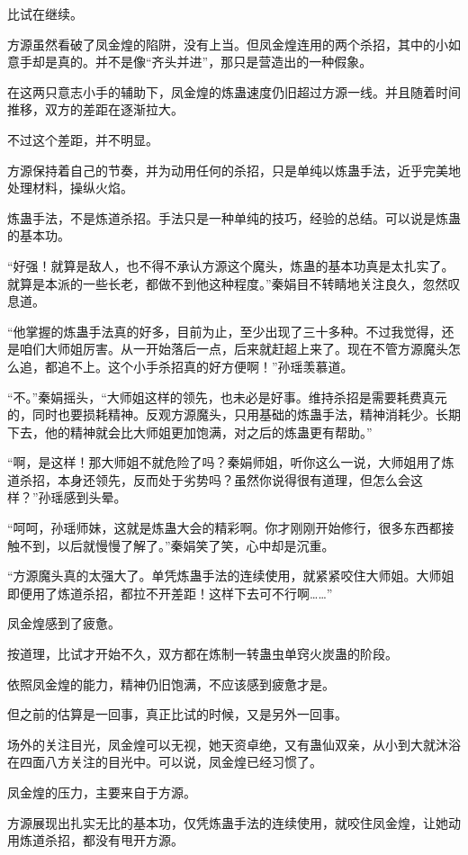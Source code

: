 \begin{this_body}
比试在继续。

方源虽然看破了凤金煌的陷阱，没有上当。但凤金煌连用的两个杀招，其中的小如意手却是真的。并不是像“齐头并进”，那只是营造出的一种假象。

在这两只意志小手的辅助下，凤金煌的炼蛊速度仍旧超过方源一线。并且随着时间推移，双方的差距在逐渐拉大。

不过这个差距，并不明显。

方源保持着自己的节奏，并为动用任何的杀招，只是单纯以炼蛊手法，近乎完美地处理材料，操纵火焰。

炼蛊手法，不是炼道杀招。手法只是一种单纯的技巧，经验的总结。可以说是炼蛊的基本功。

“好强！就算是敌人，也不得不承认方源这个魔头，炼蛊的基本功真是太扎实了。就算是本派的一些长老，都做不到他这种程度。”秦娟目不转睛地关注良久，忽然叹息道。

“他掌握的炼蛊手法真的好多，目前为止，至少出现了三十多种。不过我觉得，还是咱们大师姐厉害。从一开始落后一点，后来就赶超上来了。现在不管方源魔头怎么追，都追不上。这个小手杀招真的好方便啊！”孙瑶羡慕道。

“不。”秦娟摇头，“大师姐这样的领先，也未必是好事。维持杀招是需要耗费真元的，同时也要损耗精神。反观方源魔头，只用基础的炼蛊手法，精神消耗少。长期下去，他的精神就会比大师姐更加饱满，对之后的炼蛊更有帮助。”

“啊，是这样！那大师姐不就危险了吗？秦娟师姐，听你这么一说，大师姐用了炼道杀招，本身还领先，反而处于劣势吗？虽然你说得很有道理，但怎么会这样？”孙瑶感到头晕。

“呵呵，孙瑶师妹，这就是炼蛊大会的精彩啊。你才刚刚开始修行，很多东西都接触不到，以后就慢慢了解了。”秦娟笑了笑，心中却是沉重。

“方源魔头真的太强大了。单凭炼蛊手法的连续使用，就紧紧咬住大师姐。大师姐即便用了炼道杀招，都拉不开差距！这样下去可不行啊……”

凤金煌感到了疲惫。

按道理，比试才开始不久，双方都在炼制一转蛊虫单窍火炭蛊的阶段。

依照凤金煌的能力，精神仍旧饱满，不应该感到疲惫才是。

但之前的估算是一回事，真正比试的时候，又是另外一回事。

场外的关注目光，凤金煌可以无视，她天资卓绝，又有蛊仙双亲，从小到大就沐浴在四面八方关注的目光中。可以说，凤金煌已经习惯了。

凤金煌的压力，主要来自于方源。

方源展现出扎实无比的基本功，仅凭炼蛊手法的连续使用，就咬住凤金煌，让她动用炼道杀招，都没有甩开方源。


\end{this_body}
